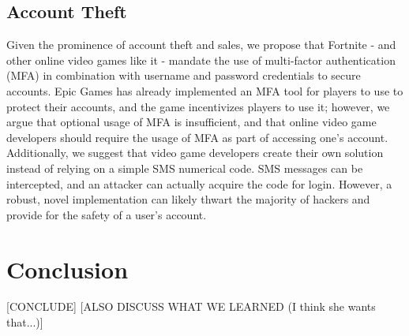 \documentclass[sigconf]{acmart}
\begin{document}
\subsection{Account Theft}
Given the prominence of account theft and sales, we propose that Fortnite -
and other online video games like it - mandate the use of multi-factor
authentication (MFA) in combination with username and password credentials to
secure accounts. Epic Games has already implemented an MFA tool for players to 
use to protect their accounts, and the game incentivizes players to use it;
however, we argue that optional usage of MFA is insufficient, and that online 
video game developers should require the usage of MFA as part of accessing one's
account. Additionally, we suggest that video game developers create their own 
solution instead of relying on a simple SMS numerical code. SMS messages can be 
intercepted, and an attacker can actually acquire the code for login. However,
a robust, novel implementation can likely thwart the majority of hackers and 
provide for the safety of a user's account.


\section{Conclusion}
[CONCLUDE]
[ALSO DISCUSS WHAT WE LEARNED (I think she wants that...)]






\end{document}
